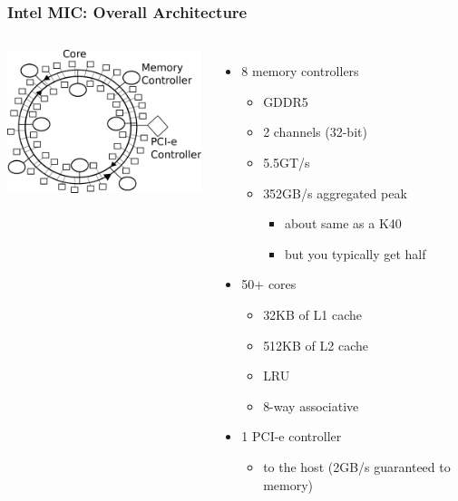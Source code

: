 \documentclass{beamer}
\begin{document}
\begin{frame}
  \frametitle{Intel MIC: Overall Architecture}
  \begin{columns}
    \column{18em}    
    \includegraphics[width=18em]{slides-figures/MIC-overview.pdf}
    \column{17em}
    
    \begin{itemize}
      \item 8 memory controllers
        \begin{itemize}
          \item GDDR5
          \item 2 channels (32-bit)
          \item 5.5GT/s
          \item 352GB/s aggregated peak
            \begin{itemize}
              \item about same as a K40 
              \item but you typically get half
            \end{itemize}
        \end{itemize}
      \item 50+ cores
        \begin{itemize}
          \item 32KB of L1 cache
          \item 512KB of L2 cache
          \item LRU
          \item 8-way associative
        \end{itemize}
      \item 1 PCI-e controller
        \begin{itemize}
          \item to the host (2GB/s guaranteed to memory)
        \end{itemize}
    \end{itemize}
  \end{columns}

\end{frame}
\end{document}

